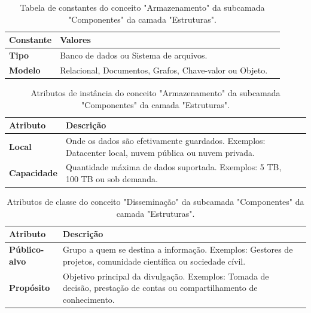 \begin{apendicesenv}
\begin{table}[H]
\centering
\caption{Tabela de constantes do conceito "Armazenamento" da subcamada "Componentes" da camada "Estruturas".}
\begin{tabularx}{\textwidth}{|l|X|X|}
\hline
\textbf{Constante} & \textbf{Valores} \\ \hline
\textbf{Tipo} & Banco de dados ou Sistema de arquivos. \\ \hline
\textbf{Modelo}& Relacional, Documentos, Grafos, Chave-valor ou Objeto. \\ \hline
\end{tabularx}
\end{table}

\begin{table}[H]
\centering
\caption{Atributos de instância do conceito "Armazenamento" da subcamada "Componentes" da camada "Estruturas".}
\begin{tabularx}{\textwidth}{|l|X|X|}
\hline
\textbf{Atributo} & \textbf{Descrição} \\ \hline
\textbf{Local}& Onde os dados são efetivamente guardados. Exemplos: Datacenter local, nuvem pública ou nuvem privada. \\ \hline
\textbf{Capacidade}& Quantidade máxima de dados suportada. Exemplos: 5 TB, 100 TB ou sob demanda.\\ \hline
\end{tabularx}
\end{table}

\begin{table}[H]
\centering
\caption{Atributos de classe do conceito "Disseminação" da subcamada "Componentes" da camada "Estruturas".}
\begin{tabularx}{\textwidth}{|l|X|X|}
\hline
\textbf{Atributo} & \textbf{Descrição} \\ \hline
\textbf{Público-alvo} & Grupo a quem se destina a informação. Exemplos: Gestores de projetos, comunidade científica ou sociedade cívil.\\ \hline
\textbf{Propósito} & Objetivo principal da divulgação. Exemplos: Tomada de decisão, prestação de contas ou compartilhamento de conhecimento. \\ \hline
\end{tabularx}
\end{table}


\end{apendicesenv}
